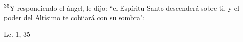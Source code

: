 \documentclass[../../rosario.tex]{subfiles}
\begin{document}
    \textsuperscript{35}Y respondiendo el ángel, le dijo: ``el Espíritu Santo descenderá sobre ti, y el poder del Altísimo te cobijará con su sombra";
    \begin{flushright}
    Lc. 1, 35
    \end{flushright}
\end{document}
